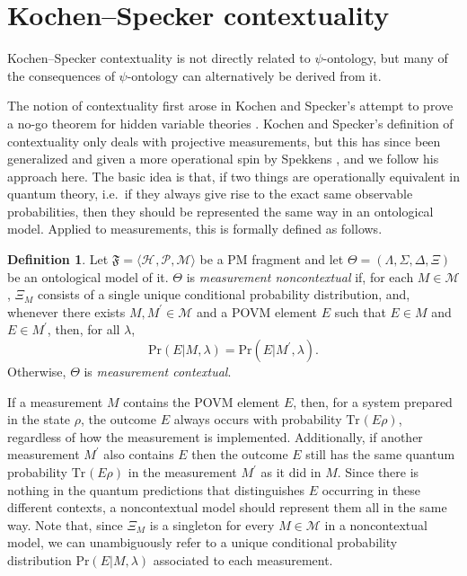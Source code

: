 \documentclass[DIV=calc,fontsize=12pt]{scrartcl} %
\theoremstyle{definition}
\newtheorem{definition}{Definition}[section]
\theoremstyle{plain}
\newcommand{\Hilb}[1][]{\ensuremath{\mathcal{H}_{#1}}}
\newcommand{\Tr}[2][]{\ensuremath{\text{Tr}_{#1} \left ( #2 \right )}}
\begin{document}
\section{Kochen--Specker contextuality}

\label{App:KS}

Kochen--Specker contextuality is not directly related to
$\psi$-ontology, but many of the consequences of $\psi$-ontology can
alternatively be derived from it.

The notion of contextuality first arose in Kochen and Specker's
attempt to prove a no-go theorem for hidden variable theories
\cite{Kochen1967}.  Kochen and Specker's definition of contextuality
only deals with projective measurements, but this has since been
generalized and given a more operational spin by Spekkens
\cite{Spekkens2005}, and we follow his approach here.  The basic idea
is that, if two things are operationally equivalent in quantum theory,
i.e.\ if they always give rise to the exact same observable
probabilities, then they should be represented the same way in an
ontological model.  Applied to measurements, this is formally defined
as follows.

\begin{definition}
Let $\mathfrak{F} = \langle \Hilb, \mathcal{P}, \mathcal{M} \rangle$
be a PM fragment and let $\Theta = (\Lambda, \Sigma, \Delta, \Xi)$
be an ontological model of it.  $\Theta$ is \emph{measurement
noncontextual} if, for each $M \in \mathcal{M}$, $\Xi_M$ consists
of a single unique conditional probability distribution, and,
whenever there exists $M,M^{\prime} \in \mathcal{M}$ and a POVM
element $E$ such that $E \in M$ and $E \in M^{\prime}$, then, for
all $\lambda$,
\begin{equation}
\text{Pr}(E|M,\lambda) = \text{Pr}(E|M^{\prime},\lambda).
\end{equation}
Otherwise, $\Theta$ is \emph{measurement contextual}.
\end{definition}

If a measurement $M$ contains the POVM element $E$, then, for a system
prepared in the state $\rho$, the outcome $E$ always occurs with
probability $\Tr{E \rho}$, regardless of how the measurement is
implemented.  Additionally, if another measurement $M^{\prime}$ also
contains $E$ then the outcome $E$ still has the same quantum
probability $\Tr{E \rho}$ in the measurement $M^{\prime}$ as it did in
$M$.  Since there is nothing in the quantum predictions that
distinguishes $E$ occurring in these different contexts, a
noncontextual model should represent them all in the same way.  Note
that, since $\Xi_M$ is a singleton for every $M \in \mathcal{M}$ in a
noncontextual model, we can unambiguously refer to a unique
conditional probability distribution $\text{Pr}(E|M,\lambda)$
associated to each measurement.
\end{document}
